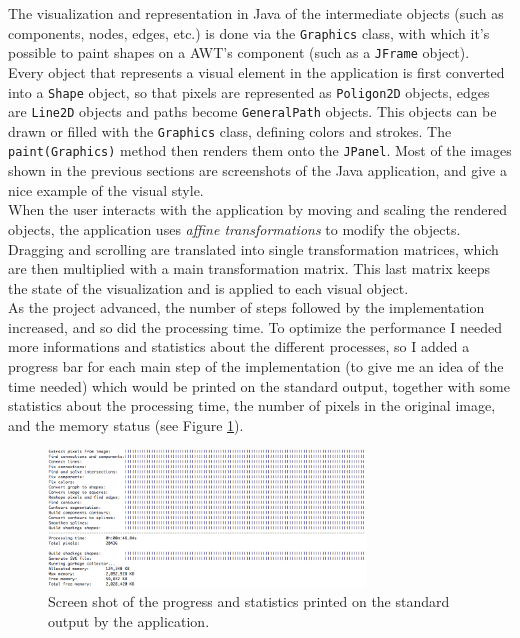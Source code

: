 \documentclass[]{usiinfbachelorproject}
\begin{document}
\noindent The visualization and representation in Java of the intermediate objects (such as components, nodes, edges, etc.) is done via the {\tt Graphics} class, with which it's possible to paint shapes on a AWT's component (such as a {\tt JFrame} object).\\
Every object that represents a visual element in the application is first converted into a {\tt Shape} object, so that pixels are represented as {\tt Poligon2D} objects, edges are {\tt Line2D} objects and paths become {\tt GeneralPath} objects. This objects can be drawn or filled with the {\tt Graphics} class, defining colors and strokes. The {\tt paint(Graphics)} method then renders them onto the {\tt JPanel}. Most of the images shown in the previous sections are screenshots of the Java application, and give a nice example of the visual style.\\
When the user interacts with the application by moving and scaling the rendered objects, the application uses \emph{affine transformations} to modify the objects. Dragging and scrolling are translated into single transformation matrices, which are then multiplied with a main transformation matrix. This last matrix keeps the state of the visualization and is applied to each visual object.\\

\noindent As the project advanced, the number of steps followed by the implementation increased, and so did the processing time. To optimize the performance I needed more informations and statistics about the different processes, so I added a progress bar for each main step of the implementation (to give me an idea of the time needed) which would be printed on the standard output, together with some statistics about the processing time, the number of pixels in the original image, and the memory status (see Figure \ref{fig:statistics}).

\begin{figure}[ht]
	\centering
	\includegraphics[width=0.75\textwidth]{img/statistics.png}
	\caption{Screen shot of the progress and statistics printed on the standard output by the application.}
	\label{fig:statistics}
\end{figure}
\end{document}
